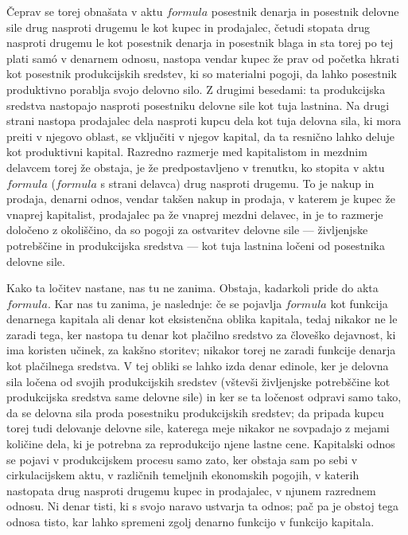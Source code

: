 \documentclass[a5paper]{scrbook}
\begin{document}
Čeprav se torej obnašata v aktu \( formula \) posestnik denarja in posestnik delovne sile drug nasproti drugemu le kot kupec in prodajalec, četudi stopata drug nasproti drugemu le kot posestnik denarja in posestnik blaga in sta torej po tej plati sam\'o v denarnem odnosu, nastopa vendar kupec že prav od početka hkrati kot posestnik produkcijskih sredstev, ki so materialni pogoji, da lahko posestnik produktivno porablja svojo delovno silo. Z drugimi besedami: ta produkcijska sredstva nastopajo nasproti posestniku delovne sile kot tuja lastnina. Na drugi strani nastopa prodajalec dela nasproti kupcu dela kot tuja delovna sila, ki mora preiti v njegovo oblast, se vključiti v njegov kapital, da ta resnično lahko deluje kot produktivni kapital. Razredno razmerje med kapitalistom in mezdnim delavcem torej že obstaja, je že predpostavljeno v trenutku, ko stopita v aktu \( formula \) (\( formula \) s strani delavca) drug nasproti drugemu. To je nakup in prodaja, denarni odnos, vendar takšen nakup in prodaja, v katerem je kupec že vnaprej kapitalist, prodajalec pa že vnaprej mezdni delavec, in je to razmerje določeno z okoliščino, da so pogoji za ostvaritev delovne sile --- življenjske potrebščine in produkcijska sredstva --- kot tuja lastnina ločeni od posestnika delovne sile.

Kako ta ločitev nastane, nas tu ne zanima. Obstaja, kadarkoli pride do akta \( formula \). Kar nas tu zanima, je naslednje: če se pojavlja \( formula \) kot funkcija denarnega kapitala ali denar kot eksistenčna oblika kapitala, tedaj nikakor ne le zaradi tega, ker nastopa tu denar kot plačilno sredstvo za človeško dejavnost, ki ima koristen učinek, za kakšno storitev; nikakor torej ne zaradi funkcije denarja kot plačilnega sredstva. V tej obliki se lahko izda denar edinole, ker je delovna sila ločena od svojih produkcijskih sredstev (vštevši življenjske potrebščine kot produkcijska sredstva same delovne sile) in ker se ta ločenost odpravi samo tako, da se delovna sila proda posestniku produkcijskih sredstev; da pripada kupcu torej tudi delovanje delovne sile, katerega meje nikakor ne sovpadajo z mejami količine dela, ki je potrebna za reprodukcijo njene lastne cene. Kapitalski odnos se pojavi v produkcijskem procesu samo zato, ker obstaja sam po sebi v cirkulacijskem aktu, v različnih temeljnih ekonomskih pogojih, v katerih nastopata drug nasproti drugemu kupec in prodajalec, v njunem razrednem odnosu. Ni denar tisti, ki s svojo naravo ustvarja ta odnos; pač pa je obstoj tega odnosa tisto, kar lahko spremeni zgolj denarno funkcijo v funkcijo kapitala.
\end{document}
